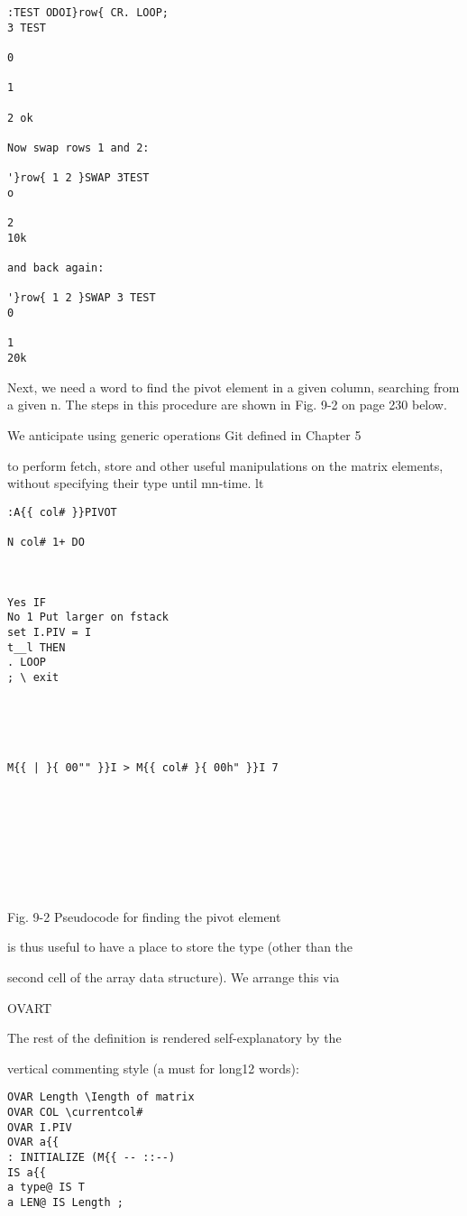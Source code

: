 {{{{{{{{{{\begin{verbatim}
:TEST ODOI}row{ CR. LOOP;
3 TEST

0

1

2 ok

Now swap rows 1 and 2:

'}row{ 1 2 }SWAP 3TEST
o

2
10k

and back again:

'}row{ 1 2 }SWAP 3 TEST
0

1
20k

\end{verbatim} 
Next, we need a word to find the pivot element in a given
column, searching from a given n. The steps in this procedure
are shown in Fig. 9-2 on page 230 below.

We anticipate using generic operations Git defined in Chapter 5

to perform fetch, store and other useful manipulations on the
matrix elements, without specifying their type until mn-time. lt




 

\begin{verbatim}
:A{{ col# }}PIVOT

N col# 1+ DO

 

Yes IF
No 1 Put larger on fstack
set I.PIV = I
t__l THEN
. LOOP
; \ exit

 

 

M{{ | }{ 00"" }}I > M{{ col# }{ 00h" }}I 7

 

 

 

 
\end{verbatim}

Fig. 9-2 Pseudocode for finding the pivot element

is thus useful to have a place to store the type (other than the

second cell of the array data structure). We arrange this via

OVART

The rest of the definition is rendered self-explanatory by the

vertical commenting style (a must for long12 words):
\begin{verbatim}
OVAR Length \Iength of matrix
OVAR COL \currentcol#
OVAR I.PIV
OVAR a{{
: INITIALIZE (M{{ -- ::--)
IS a{{
a type@ IS T
a LEN@ IS Length ;


\end{verbatim}}}}}}}}}}}
